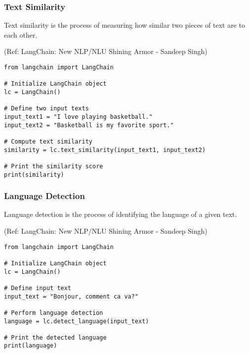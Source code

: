 \begin{frame}[fragile]\frametitle{Text Similarity}

Text similarity is the process of measuring how similar two pieces of text are to each other.

{\tiny (Ref: LangChain: New NLP/NLU Shining Armor - Sandeep Singh)}

\begin{lstlisting}
from langchain import LangChain

# Initialize LangChain object
lc = LangChain()

# Define two input texts
input_text1 = "I love playing basketball."
input_text2 = "Basketball is my favorite sport."

# Compute text similarity
similarity = lc.text_similarity(input_text1, input_text2)

# Print the similarity score
print(similarity)
\end{lstlisting}	  

\end{frame}

\begin{frame}[fragile]\frametitle{Language Detection}

Language detection is the process of identifying the language of a given text.

{\tiny (Ref: LangChain: New NLP/NLU Shining Armor - Sandeep Singh)}

\begin{lstlisting}
from langchain import LangChain

# Initialize LangChain object
lc = LangChain()

# Define input text
input_text = "Bonjour, comment ca va?"

# Perform language detection
language = lc.detect_language(input_text)

# Print the detected language
print(language)
\end{lstlisting}	  

\end{frame}

